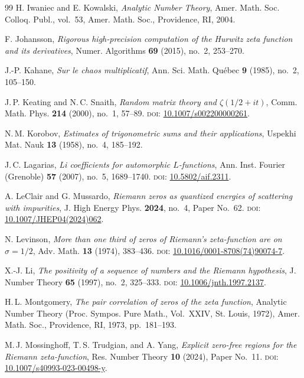 \documentclass[11pt]{amsart}
\theoremstyle{definition}
\theoremstyle{remark}
\begin{document}
\begin{thebibliography}{99}
H. Iwaniec and E. Kowalski,
\textit{Analytic Number Theory},
Amer. Math. Soc. Colloq. Publ., vol.~53, Amer. Math. Soc., Providence, RI, 2004.

F. Johansson,
\textit{Rigorous high-precision computation of the Hurwitz zeta function and its derivatives},
Numer. Algorithms \textbf{69} (2015), no.~2, 253--270.

J.-P. Kahane,
\textit{Sur le chaos multiplicatif},
Ann. Sci. Math. Qu\'ebec \textbf{9} (1985), no.~2, 105--150.

J.\,P. Keating and N.\,C. Snaith,
\textit{Random matrix theory and $\zeta(1/2+it)$},
Comm. Math. Phys. \textbf{214} (2000), no.~1, 57--89.
\textsc{doi:} \href{https://doi.org/10.1007/s002200000261}{10.1007/s002200000261}.

N.\,M. Korobov,
\textit{Estimates of trigonometric sums and their applications},
Uspekhi Mat. Nauk \textbf{13} (1958), no.~4, 185--192.

J.\,C. Lagarias,
\textit{Li coefficients for automorphic $L$-functions},
Ann. Inst. Fourier (Grenoble) \textbf{57} (2007), no.~5, 1689--1740.
\textsc{doi:} \href{https://doi.org/10.5802/aif.2311}{10.5802/aif.2311}.

A. LeClair and G. Mussardo,
\textit{Riemann zeros as quantized energies of scattering with impurities},
J. High Energy Phys. \textbf{2024}, no.~4, Paper No.~62.
\textsc{doi:} \href{https://doi.org/10.1007/JHEP04(2024)062}{10.1007/JHEP04(2024)062}.

N. Levinson,
\textit{More than one third of zeros of Riemann's zeta-function are on $\sigma = 1/2$},
Adv. Math. \textbf{13} (1974), 383--436.
\textsc{doi:} \href{https://doi.org/10.1016/0001-8708(74)90074-7}{10.1016/0001-8708(74)90074-7}.

X.-J. Li,
\textit{The positivity of a sequence of numbers and the Riemann hypothesis},
J. Number Theory \textbf{65} (1997), no.~2, 325--333.
\textsc{doi:} \href{https://doi.org/10.1006/jnth.1997.2137}{10.1006/jnth.1997.2137}.

H.\,L. Montgomery,
\textit{The pair correlation of zeros of the zeta function},
Analytic Number Theory (Proc. Sympos. Pure Math., Vol.~XXIV, St. Louis, 1972),
Amer. Math. Soc., Providence, RI, 1973, pp.~181--193.

M.\,J. Mossinghoff, T.\,S. Trudgian, and A. Yang,
\textit{Explicit zero-free regions for the Riemann zeta-function},
Res. Number Theory \textbf{10} (2024), Paper No.~11.
\textsc{doi:} \href{https://doi.org/10.1007/s40993-023-00498-y}{10.1007/s40993-023-00498-y}.


\end{thebibliography}
\end{document}
